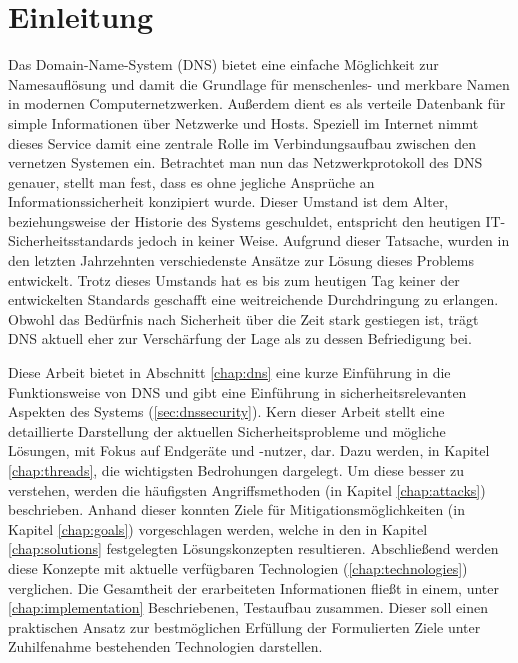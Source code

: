 \chapter{Einleitung}
Das Domain-Name-System (DNS) bietet eine einfache Möglichkeit zur Namesauflösung und damit die Grundlage für menschenles- und merkbare Namen in modernen Computernetzwerken. Außerdem dient es als verteile Datenbank für simple Informationen über Netzwerke und Hosts. Speziell im Internet nimmt dieses Service damit eine zentrale Rolle im Verbindungsaufbau zwischen den vernetzen Systemen ein. Betrachtet man nun das Netzwerkprotokoll des DNS genauer, stellt man fest, dass es ohne jegliche Ansprüche an Informationssicherheit konzipiert wurde. Dieser Umstand ist dem Alter, beziehungsweise der Historie des Systems geschuldet, entspricht den heutigen IT-Sicherheitsstandards jedoch in keiner Weise. Aufgrund dieser Tatsache, wurden in den letzten Jahrzehnten verschiedenste Ansätze zur Lösung dieses Problems entwickelt. Trotz dieses Umstands hat es bis zum heutigen Tag keiner der entwickelten Standards geschafft eine weitreichende Durchdringung zu erlangen. Obwohl das Bedürfnis nach Sicherheit über die Zeit stark gestiegen ist, trägt DNS aktuell eher zur Verschärfung der Lage als zu dessen Befriedigung bei.

Diese Arbeit bietet in Abschnitt \ref{chap:dns} eine kurze Einführung in die Funktionsweise von DNS und gibt eine Einführung in sicherheitsrelevanten Aspekten des Systems (\ref{sec:dnssecurity}). Kern dieser Arbeit stellt eine detaillierte Darstellung der aktuellen Sicherheitsprobleme und mögliche Lösungen, mit Fokus auf Endgeräte und -nutzer, dar. Dazu werden, in Kapitel \ref{chap:threads}, die wichtigsten Bedrohungen dargelegt. Um diese besser zu verstehen, werden die häufigsten Angriffsmethoden (in Kapitel \ref{chap:attacks}) beschrieben. Anhand dieser konnten Ziele für Mitigationsmöglichkeiten (in Kapitel \ref{chap:goals}) vorgeschlagen werden, welche in den in Kapitel \ref{chap:solutions} festgelegten Lösungskonzepten resultieren. Abschließend werden diese Konzepte mit aktuelle verfügbaren Technologien (\ref{chap:technologies}) verglichen. Die Gesamtheit der erarbeiteten Informationen fließt in einem, unter \ref{chap:implementation} Beschriebenen, Testaufbau zusammen. Dieser soll einen praktischen Ansatz zur bestmöglichen Erfüllung der Formulierten Ziele unter Zuhilfenahme bestehenden Technologien darstellen.
